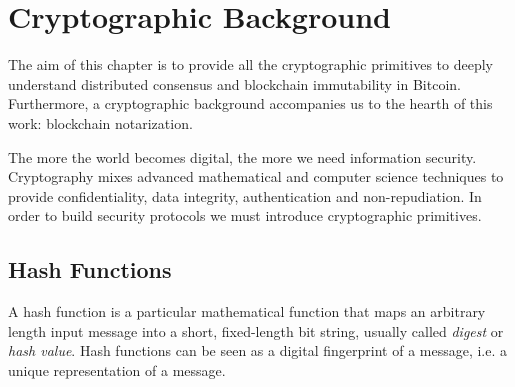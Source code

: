 \chapter{Cryptographic Background}
\label{chpr:crypto}
The aim of this chapter is to provide all the cryptographic primitives to deeply understand distributed consensus and blockchain immutability in Bitcoin. Furthermore, a cryptographic background accompanies us to the hearth of this work: blockchain notarization.

\bigskip
\noindent
The more the world becomes digital, the more we need information security. Cryptography mixes advanced mathematical and computer science techniques to provide confidentiality, data integrity, authentication and non-repudiation. In order to build security protocols we must introduce cryptographic primitives.

\section{Hash Functions}
A hash function is a particular mathematical function that maps an arbitrary length input message into a short, fixed-length bit string, usually called \textit{digest} or \textit{hash value}. Hash functions can be seen as a digital fingerprint of a message, i.e. a unique representation of a message.